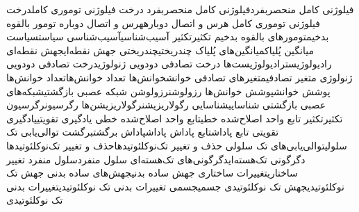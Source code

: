 {فیلوژنی کامل منحصربفرد}{فیلوژنی کامل منحصربفرد}
{درخت فیلوژنی توموری کامل}{درخت فیلوژنی توموری کامل}
{هرس و اتصال دوباره}{هرس و اتصال دوباره}
{تومور بالقوه بدخیم}{تومورهای بالقوه بدخیم}
{تکثیر}{تکثیر}
{آسیب‌شناسی}{آسیب‌شناسی}
{سیاست}{سیاست}
{میانگین پُلیاک}{میانگین‌های پُلیاک}
{چندریختی}{چندریختی}
{جهش نقطه‌ای}{جهش نقطه‌ای}
{رادیولوژیست}{رادیولوژیست‌ها}
{درخت تصادفی دودویی ژنولوژی}{درخت تصادفی دودویی ژنولوژی}
{متغیر تصادفی}{متغیرهای تصادفی}
{خوانش}{خوانش‌ها}
{تعداد خوانش‌ها}{تعداد خوانش‌ها}
{پوشش خوانش}{پوشش خوانش‌ها}
{رزولوشن}{رزولوشن}
{شبکه‌ عصبی بازگشتی}{شبکه‌های عصبی بازگشتی}
{شناسایی}{شناسایی}
{رگولاریزیشن}{رگولاریزیشن‌ها}
{رگرسیون}{رگرسیون}
{تکثیر}{تکثیر}
{تابع واحد اصلاح‌شده خطی}{تابع واحد اصلاح‌شده خطی}
{یادگیری تقویتی}{یادگیری تقویتی}
{تابع پاداش}{تابع پاداش}
{پاداش}{پاداش}
{برگشت}{برگشت}
{توالی‌یابی تک سلولی}{توالی‌یابی‌های تک سلولی}
{حذف و تغییر تک‌نوکلئوتیدها}{حذف و تغییر تک‌نوکلئوتیدها}
{دگرگونی تک‌هسته‌ای}{دگرگونی‌های تک‌هسته‌ای}
{سلول منفرد}{سلول منفرد}
{تغییر ساختاری}{تغییرات ساختاری}
{جهش ساده بدنی}{جهش‌های ساده بدنی}
{جهش تک نوکلئوتیدی}{جهش تک نوکلئوتیدی}
{جسمی}{جسمی}
{تغییرات بدنی تک نوکلئوتیدی}{تغییرات بدنی تک نوکلئوتیدی}
